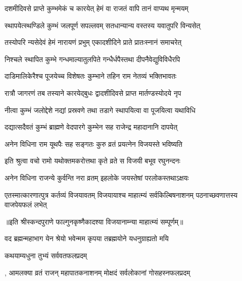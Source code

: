 \twolineshloka
{दशमीदिवसे प्राप्ते कुम्भमेकं च कारयेत्}
{हेमं वा राजतं वापि तानं वाप्यथ मृन्मयम्} %

\twolineshloka
{स्थापयेत्स्थण्डिले कुम्भं जलपूर्ण सपल्लवम्}
{सतधान्यान्य वस्तस्य यवातुपरि विन्यसेत्} %

\twolineshloka
{तस्योपरि न्यसेदेवं हेमं नारायणं प्रभुम्}
{एकादशीदिने प्राते प्रातःस्नानं समाचरेत्} %

\twolineshloka
{निश्चले स्थापित कुम्भे गन्धमाल्यातुलपिते}
{गन्धैर्धपैस्तथा दीपनैवेद्युविविधैरपि} %

\twolineshloka
{दाडिमालिकेरैश्च पूजयेच्च विशेषतः}
{कुम्भाने तहिन राम नेतव्यं भक्तिभावतः} %

\twolineshloka
{रात्रौ जागरणं तब तस्याने कारयेद्बुधः}
{द्वादशीदिवसे प्राप्त मार्तण्डस्योदये नृप} %

\twolineshloka
{नीत्वा कुम्भं जलोद्देशे नद्यां प्रस्रवणे तथा}
{तडागे स्थापयित्वा वा पूजयित्वा यथाविधि} %

\twolineshloka
{दद्यात्सदैवतं कुम्भं ब्राह्मणे वेदपारगे}
{कुम्भेन सह राजेन्द्र महादानानि दापयेत्} %

\twolineshloka
{अनेन विधिना राम यूथपैः सह सङ्गतः}
{कुरु व्रतं प्रयत्नेन विजयस्ते भविष्यति} %

\twolineshloka
{इति श्रुत्वा वचो रामो यथोक्तमकरोत्तथा}
{कृते व्रते स विजयी बभूव रघुनन्दनः} %

\twolineshloka
{अनेन विधिना राजन्ये कुर्वन्ति नरा व्रतम्}
{इहलोके जयस्तेषां परलोकस्तथाऽक्षयः} %


\threelineshloka
{एतस्मात्कारणात्पुत्र कर्तव्यं विजयावतम्}
{विजयायाश्च माहात्म्यं सर्वकिल्बिषनाशनम्}
{पठनाच्छवणात्तस्य वाजपेयफलं लभेत्} %

॥इति श्रीस्कन्दपुराणे फाल्गुनकृष्णैकादश्या विजयानाम्न्या माहात्म्यं सम्पूर्णम्॥


\hyperref[sec:ekadashi_mahatmyam_vrata_raja]{\closesub}
\clearpage

\label{sec:vrata-raja-phalguna-shuklamalaki}


\twolineshloka
{वद ब्रह्मन्महाभाग येन श्रेयो भवेन्मम}
{कृपया तब्रह्मयोने यधनुग्राह्यतो मयि} %



\onelineshloka
{कथयाम्यधुना तुभ्यं सर्ववतफलप्रदम्} %

\twolineshloka
{, आमलक्या व्रतं राजन् महापातकनाशनम्}
{मोक्षदं सर्वलोकानां गोसहस्नफलप्रदम्} %

